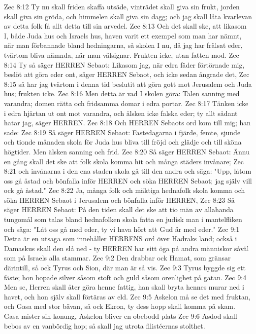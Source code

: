 Zec 8:12  Ty nu skall friden skaffa utsäde, vinträdet skall giva sin frukt, jorden skall giva sin gröda, och himmelen skall giva sin dagg; och jag skall låta kvarlevan av detta folk få allt detta till sin arvedel.
Zec 8:13  Och det skall ske, att likasom I, både Juda hus och Israels hus, haven varit ett exempel som man har nämnt, när man förbannade bland hedningarna, så skolen I nu, då jag har frälsat eder, tvärtom bliva nämnda, när man välsignar. Frukten icke, utan fatten mod.
Zec 8:14  Ty så säger HERREN Sebaot: Likasom jag, när edra fäder förtörnade mig, beslöt att göra eder ont, säger HERREN Sebaot, och icke sedan ångrade det,
Zec 8:15  så har jag tvärtom i denna tid beslutit att göra gott mot Jerusalem och Juda hus; frukten icke.
Zec 8:16  Men detta är vad I skolen göra: Talen sanning med varandra; domen rätta och fridsamma domar i edra portar.
Zec 8:17  Tänken icke i edra hjärtan ut ont mot varandra, och älsken icke falska eder; ty allt sådant hatar jag, säger HERREN.
Zec 8:18  Och HERREN Sebaots ord kom till mig; han sade:
Zec 8:19  Så säger HERREN Sebaot: Fastedagarna i fjärde, femte, sjunde och tionde månaden skola för Juda hus bliva till fröjd och glädje och till sköna högtider. Men älsken sanning och frid.
Zec 8:20  Så säger HERREN Sebaot: Ännu en gång skall det ske att folk skola komma hit och många städers invånare;
Zec 8:21  och invånarna i den ena staden skola gå till den andra och säga: "Upp, låtom oss gå åstad och bönfalla inför HERREN och söka HERREN Sebaot; jag själv vill ock gå åstad."
Zec 8:22  Ja, många folk och mäktiga hednafolk skola komma och söka HERREN Sebaot i Jerusalem och bönfalla inför HERREN,
Zec 8:23  Så säger HERREN Sebaot: På den tiden skall det ske att tio män av allahanda tungomål som talas bland hednafolken skola fatta en judisk man i mantelfliken och säga: "Låt oss gå med eder, ty vi hava hört att Gud är med eder."
Zec 9:1  Detta är en utsaga som innehåller HERRENS ord över Hadraks land; också i Damaskus skall den slå ned - ty HERREN har sitt öga på andra människor såväl som på Israels alla stammar.
Zec 9:2  Den drabbar ock Hamat, som gränsar därintill, så ock Tyrus och Sion, där man är så vis.
Zec 9:3  Tyrus byggde sig ett fäste; hon hopade silver såsom stoft och guld såsom orenlighet på gatan.
Zec 9:4  Men se, Herren skall åter göra henne fattig, han skall bryta hennes murar ned i havet, och hon själv skall förtäras av eld.
Zec 9:5  Askelon må se det med fruktan, och Gasa med stor bävan, så ock Ekron, ty dess hopp skall komma på skam. Gasa mister sin konung, Askelon bliver en obebodd plats
Zec 9:6  Asdod skall bebos av en vanbördig hop; så skall jag utrota filistéernas stolthet.
